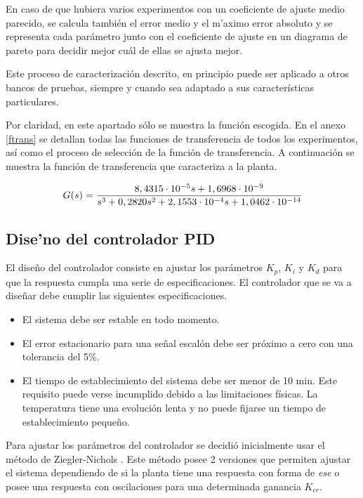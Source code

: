 	En caso de que hubiera varios experimentos con un coeficiente de ajuste medio parecido, se calcula también el error medio y el m'aximo error absoluto y se representa cada parámetro junto con el coeficiente de ajuste en un diagrama de pareto para decidir mejor cuál de ellas se ajusta mejor.

	Este proceso de caracterización descrito, en principio puede ser aplicado a otros bancos de pruebas, siempre y cuando sea adaptado a sus características particulares. 

	Por claridad, en este apartado sólo se muestra la función escogida. En el anexo \ref{ftrans} se detallan todas las  funciones de transferencia de todos los experimentos, así como el proceso de selección de la función de transferencia. A continuación se muestra la función de transferencia que caracteriza a la planta.

\begin{equation}\label{ecuacion4_2}
          \normalsize G(s) = \frac{8,4315 \cdot 10^{-5}s + 1,6968 \cdot 10^{-9}}{s^{3} + 0,2820s^{2} + 2,1553\cdot 10^{-4}s + 1,0462\cdot10^{-14}}
\end{equation} 

\subsection{Dise'no del controlador PID}\label{subsec:diseñoPID}

	El diseño del controlador consiste en ajustar los parámetros  $K_{p}$, $K_{i}$ y $K_{d}$ para que la respuesta cumpla una serie de especificaciones. El controlador que se va a diseñar debe cumplir las siguientes especificaciones.

\begin{itemize}
	\item El sistema debe ser estable en todo momento.
	\item El error estacionario para una señal escalón debe ser próximo a cero con una tolerancia del 5\%.
	\item El tiempo de establecimiento del sistema debe ser menor de 10 min. Este requisito puede verse incumplido debido a las limitaciones físicas. La temperatura tiene una evolución lenta y no puede fijarse un tiempo de establecimiento pequeño.
\end{itemize}

	Para ajustar los parámetros del controlador se decidió inicialmente usar el método de Ziegler-Nichols \cite{PID}. Este método posee 2 versiones que permiten ajustar el sistema dependiendo de si la planta tiene una respuesta con forma de \textit{ese} o posee una respuesta con oscilaciones para una determinada ganancia $K_{cr}$. 

